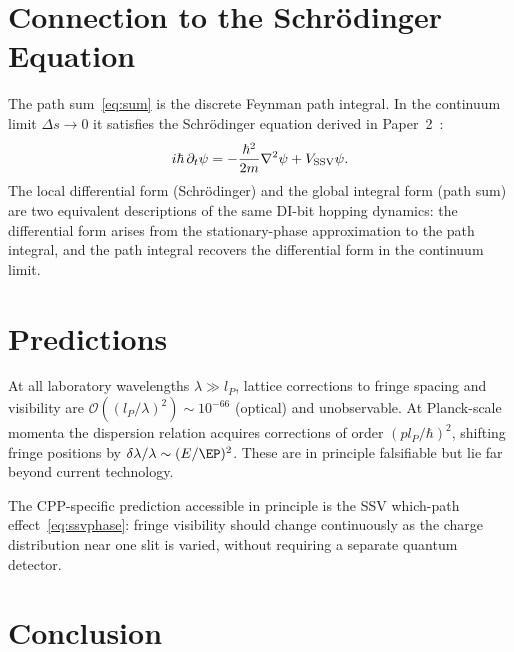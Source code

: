 \documentclass[11pt,a4paper]{article}
\newcommand{\lP}{l_P}
\begin{document}
\section{Connection to the Schr\"{o}dinger Equation}

The path sum~\eqref{eq:sum} is the discrete Feynman path integral.
In the continuum limit $\Delta s \to 0$ it satisfies the Schr\"{o}dinger
equation derived in Paper~2~\cite{cpp2040a}:
\begin{equation}
i\hbar\,\partial_t\psi = -\frac{\hbar^2}{2m}\nabla^2\psi + V_{\rm SSV}\psi.
\end{equation}
The local differential form (Schr\"{o}dinger) and the global integral
form (path sum) are two equivalent descriptions of the same DI-bit
hopping dynamics: the differential form arises from the stationary-phase
approximation to the path integral, and the path integral recovers
the differential form in the continuum limit.

\section{Predictions}

At all laboratory wavelengths $\lambda \gg \lP$, lattice corrections
to fringe spacing and visibility are $\mathcal{O}((\lP/\lambda)^2)
\sim 10^{-66}$ (optical) and unobservable.  At Planck-scale momenta
the dispersion relation acquires corrections of order $(p\lP/\hbar)^2$,
shifting fringe positions by $\delta\lambda/\lambda \sim (E/\EP)^2$.
These are in principle falsifiable but lie far beyond current
technology.

The CPP-specific prediction accessible in principle is the SSV
which-path effect~\eqref{eq:ssvphase}: fringe visibility should
change continuously as the charge distribution near one slit is varied,
without requiring a separate quantum detector.

\section{Conclusion}
\end{document}
